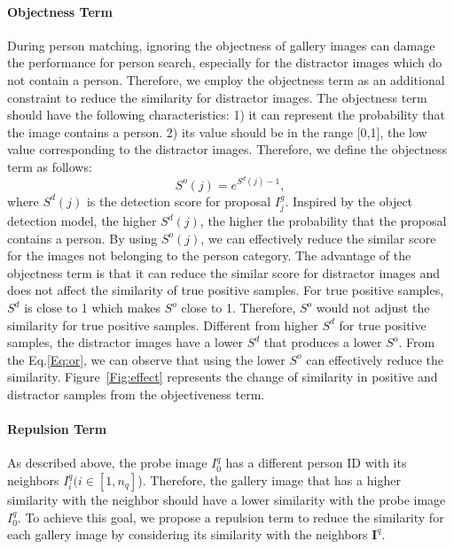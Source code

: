 \documentclass[journal]{IEEEtran}
\begin{document}
\paragraph{Objectness Term} During person matching, ignoring the objectness of gallery images can damage the performance for person search, especially for the distractor images which do not contain a person. 
Therefore, we employ the objectness term as an additional constraint to reduce the similarity for distractor images. The objectness term should have the following characteristics: 1) it can represent the probability that the image contains a person. 2) its value should be in the range [0,1], the low value corresponding to the distractor images. Therefore, we define the objectness term as follows:
\begin{equation}
S^{o}(j)=e^{S^{d}(j)-1},
\label{eq:ot}
\end{equation}
where $S^{d}(j)$ is the detection score for proposal $I^{g}_{j}$. Inspired by the object detection model, the higher $S^{d}(j)$, the higher the probability that the proposal contains a person. By using $S^{o}(j)$, we can effectively reduce the similar score for the images not belonging to the person category. The advantage of the objectness term is that it can reduce the similar score for distractor images and does not affect the similarity of true positive samples. 
For true positive samples, $S^{d}$ is close to 1 which makes $S^{o}$ close to 1. Therefore, $S^{o}$ would not adjust the similarity for true positive samples. Different from higher $S^{d}$ for true positive samples, the distractor images have a lower $S^{d}$ that produces a lower $S^{o}$.  From the Eq.\eqref{Eq:or}, we can observe that using the lower $S^{o}$ can effectively reduce the similarity.  Figure~\ref{Fig:effect} represents the change of similarity in positive and distractor samples from the objectiveness term.

\paragraph{Repulsion Term} As described above, the probe image $I^{q}_{0}$ has a different person ID with its neighbors $I^{q}_{i} (i\in[1,n_{q}]$). 
Therefore, the gallery image that has a higher similarity with the neighbor should have a lower similarity with the probe image $I^{q}_{0}$. 
To achieve this goal, we propose a repulsion term to reduce the similarity for each gallery image by considering its similarity with the neighbors $\boldsymbol{I}^{q}$.
\end{document}
